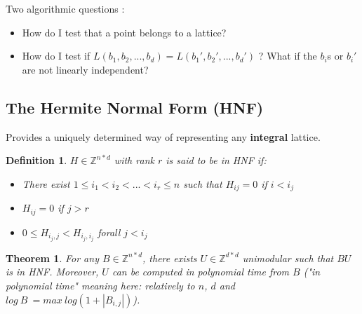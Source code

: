 \documentclass[a4paper,10pt]{article}
\newtheorem{definition}{Definition}
\newtheorem{theorem}{Theorem}
\begin{document}
Two algorithmic questions :

\begin{itemize}
\item How do I test that a point belongs to a lattice?
\item How do I test if $L(b_1,b_2,...,b_d)=L(b_1',b_2',...,b_d')$ ? What if the $b_i$s or $b_i'$ are not linearly independent?
\end{itemize}

\subsection{The Hermite Normal Form (HNF)}
Provides a uniquely determined way of representing any \textbf{integral} lattice.

\begin{definition}
$H \in \mathbb{Z}^{n*d}$ with rank $r$ is said to be in HNF if:
\begin{itemize}
\item There exist $1 \leq i_1 < i_2 < ... < i_r \leq n$ such that $H_{ij}=0$ if $i < i_j$
\item $H_{ij} =0$ if $j>r$
\item $0 \leq H_{i_j,j} < H_{i_j,i_j}$ forall $j < i_j$
\end{itemize}
\end{definition}

\begin{theorem}
For any $B \in \mathbb{Z}^{n*d}$, there exists $U \in \mathbb{Z}^{d*d}$ unimodular such that $B U$ is in HNF. Moreover, $U$ can be computed in polynomial time from $B$ ("in polynomial time" meaning here: relatively to $n$, $d$ and $log \ B \ = max \ log(1+|B_{i,j}|)$).
\end{theorem}
\end{document}
